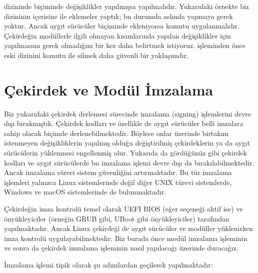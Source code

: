 \documentclass[a4paper,10pt,turkish]{sphinxmanual}
\begin{document}
\sphinxAtStartPar
{} dizininde  biçiminde değişiklikler yapılmışsa  yapılmalıdır.
Yukarıdaki örnekte biz  dizininin içerisine  ile eklemeler yaptık; bu durumda aslında
 yapmaya gerek yoktur. Ancak aygıt sürücüler  biçiminde ekleniyorsa
 komutu uygulanmalıdır. Çekirdeğin modüllerle ilgili olmayan kısımlarında yapılan
değişiklikler için  yapılmasına gerek olmadığını bir kez daha belirtmek istiyoruz.
 işleminden önce eski  dizinini  komutu
ile silmek daha güvenli bir yaklaşımdır.


\section{Çekirdek ve Modül İmzalama}
\label{\detokenize{kernelcompilation:cekirdek-ve-modul-imzalama}}
\sphinxAtStartPar
Biz yukarıdaki çekirdek derlemesi sürecinde imzalama (signing) işlemlerini devre dışı bırakmıştık.
Çekirdek kodları ve özellikle de aygıt sürücüler belli imzalara sahip olacak biçimde derlenebilmektedir.
Böylece onlar üzerinde birtakım istenmeyen değişikliklerin yapılmış olduğu değiştirilmiş çekirdeklerin
ya da aygıt sürücülerin yüklenmesi engellenmiş olur. Yukarıda da gördüğünüz gibi çekirdek kodları ve
aygıt sürücülerde bu imzalama işlemi devre dışı da bırakılabilmektedir. Ancak imzalama süreci sistem
güvenliğini artırmaktadır. Bu tür imzalama işlemleri yalnızca Linux sistemlerinde değil diğer UNIX
türevi sistemlerde, Windows ve macOS sistemlerinde de bulunmaktadır.

\sphinxAtStartPar
Çekirdeğin imza kontrolü temel olarak UEFI BIOS (eğer  seçeneği aktif ise) ve önyükleyiciler
(örneğin GRUB gibi, U\sphinxhyphen{}Boot gibi önyükleyiciler) tarafından yapılmaktadır. Ancak Linux çekirdeği de aygıt
sürücüler ve modüller yüklenirken imza kontrolü uygulayabilmektedir. Biz burada önce modül imzalama
işleminin ve sonra da çekirdek imzalama işleminin nasıl yapılacağı üzerinde duracağız.

\sphinxAtStartPar
İmzalama işlemi tipik olarak şu adımlardan geçilerek yapılmaktadır:
\end{document}
